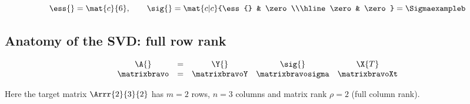 \begin{equation*}
  \ess{} = \mat{c}{6}, \qquad \sig{}= \mat{c|c}{\ess{} & \zero \\\hline \zero & \zero} = \Sigmaexampleb
\end{equation*}

\subsection{Anatomy of the SVD: full row rank}

\begin{equation*}
  \begin{array}{ccccc}
    \A{} &=& \Y{} & \sig{} & \X{T} \\
    \matrixbravo & = & \matrixbravoY & \matrixbravosigma & \matrixbravoXt
  \end{array}
\end{equation*}

Here the target matrix $\Arrr{2}{3}{2}$ has $m=2$ rows, $n=3$ columns and matrix rank $\rho =2$ (full column rank).

